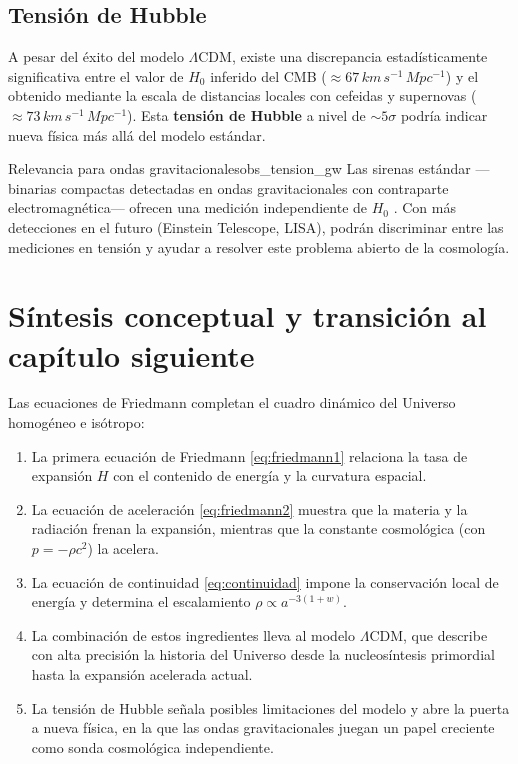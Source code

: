 \subsection{Tensión de Hubble}

A pesar del éxito del modelo $\Lambda$CDM, existe una discrepancia estadísticamente significativa entre el valor de $H_0$ inferido del CMB ($\approx67\,\si{km\,s^{-1}\,Mpc^{-1}}$) y el obtenido mediante la escala de distancias locales con cefeidas y supernovas ($\approx73\,\si{km\,s^{-1}\,Mpc^{-1}}$). Esta \textbf{tensión de Hubble} a nivel de $\sim5\sigma$ podría indicar nueva física más allá del modelo estándar.

\begin{observacion}{Relevancia para ondas gravitacionales}{obs_tension_gw}
Las sirenas estándar —binarias compactas detectadas en ondas gravitacionales con contraparte electromagnética— ofrecen una medición independiente de $H_0$ \cite{Abbott2017H0}. Con más detecciones en el futuro (Einstein Telescope, LISA), podrán discriminar entre las mediciones en tensión y ayudar a resolver este problema abierto de la cosmología.
\end{observacion}

\section{Síntesis conceptual y transición al capítulo siguiente}
\label{sec:sintesis_cap11}

Las ecuaciones de Friedmann completan el cuadro dinámico del Universo homogéneo e isótropo:
\begin{enumerate}[leftmargin=2em, label=\textbf{\arabic*.}]
  \item La primera ecuación de Friedmann \eqref{eq:friedmann1} relaciona la tasa de expansión $H$ con el contenido de energía y la curvatura espacial.
  \item La ecuación de aceleración \eqref{eq:friedmann2} muestra que la materia y la radiación frenan la expansión, mientras que la constante cosmológica (con $p=-\rho c^2$) la acelera.
  \item La ecuación de continuidad \eqref{eq:continuidad} impone la conservación local de energía y determina el escalamiento $\rho\propto a^{-3(1+w)}$.
  \item La combinación de estos ingredientes lleva al modelo $\Lambda$CDM, que describe con alta precisión la historia del Universo desde la nucleosíntesis primordial hasta la expansión acelerada actual.
  \item La tensión de Hubble señala posibles limitaciones del modelo y abre la puerta a nueva física, en la que las ondas gravitacionales juegan un papel creciente como sonda cosmológica independiente.
\end{enumerate}


